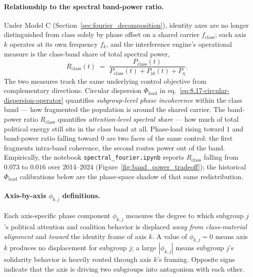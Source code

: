 \paragraph{Relationship to the spectral band-power ratio.}
Under Model C (Section~\ref{sec:fourier_decomposition}), identity axes are no longer distinguished from class solely by phase offset on a shared carrier $f_{\text{class}}$; each axis $k$ operates at its own frequency $f_k$, and the interference engine's operational measure is the class-band share of total spectral power,
\begin{equation}\label{eq:8.22-45b}
R_{\text{class}}(t) \;=\; \frac{P_{\text{class}}(t)}{P_{\text{class}}(t) + P_{\text{id}}(t) + P_{\eta}}.
\end{equation}
The two measures track the same underlying control objective from complementary directions. Circular dispersion $\Phi_{\text{load}}$ in eq.~\ref{eq:8.17-circular-dispersion-operator} quantifies \emph{subgroup-level phase incoherence} within the class band --- how fragmented the population is around the shared carrier. The band-power ratio $R_{\text{class}}$ quantifies \emph{attention-level spectral share} --- how much of total political energy still sits in the class band at all. Phase-load rising toward $1$ and band-power ratio falling toward $0$ are two faces of the same control: the first fragments intra-band coherence, the second routes power out of the band. Empirically, the notebook \texttt{spectral\_fourier.ipynb} reports $R_{\text{class}}$ falling from $0.073$ to $0.016$ over 2014--2024 (Figure~\ref{fig:band_power_tradeoff}); the historical $\Phi_{\text{load}}$ calibrations below are the phase-space shadow of that same redistribution.

\paragraph{Axis-by-axis $\phi_{k,j}$ definitions.}
Each axis-specific phase component $\phi_{k,j}$ measures the degree to which subgroup $j$'s political attention and coalition behavior is displaced \textit{away from class-material alignment} and \textit{toward} the identity frame of axis $k$. A value of $\phi_{k,j} = 0$ means axis $k$ produces no displacement for subgroup $j$; a large $|\phi_{k,j}|$ means subgroup $j$'s solidarity behavior is heavily routed through axis $k$'s framing. Opposite signs indicate that the axis is driving two subgroups into antagonism with each other.

